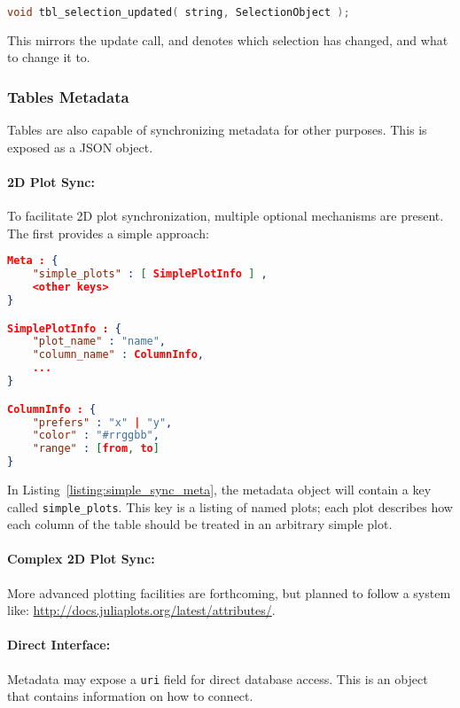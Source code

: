 \documentclass[11pt, oneside]{amsart}
\begin{document}
\begin{lstlisting}[language=c++]
	void tbl_selection_updated( string, SelectionObject );
\end{lstlisting}

This mirrors the update call, and denotes which selection has changed, and what to change it to.

\subsubsection{Tables Metadata}

Tables are also capable of synchronizing metadata for other purposes. This is exposed as a JSON object.

\paragraph{2D Plot Sync:} To facilitate 2D plot synchronization, multiple optional mechanisms are present. The first provides a simple approach:

\begin{lstlisting}[language=json, label=listing:simple_sync_meta, caption=Table Metadata for Plot Sync ]
Meta : {
	"simple_plots" : [ SimplePlotInfo ] ,
	<other keys>
}

SimplePlotInfo : {
	"plot_name" : "name",
	"column_name" : ColumnInfo,
	...
}

ColumnInfo : {
	"prefers" : "x" | "y",
	"color" : "#rrggbb",
	"range" : [from, to]
}
\end{lstlisting}

In Listing~\ref{listing:simple_sync_meta}, the metadata object will contain a key called \texttt{simple\_plots}. This key is a listing of named plots; each plot describes how each column of the table should be treated in an arbitrary simple plot.

\paragraph{Complex 2D Plot Sync:} More advanced plotting facilities are forthcoming, but planned to follow a system like:
\url{http://docs.juliaplots.org/latest/attributes/}.

\paragraph{Direct Interface:} Metadata may expose a \texttt{uri} field for direct database access. This is an object that contains information on how to connect.
\end{document}
